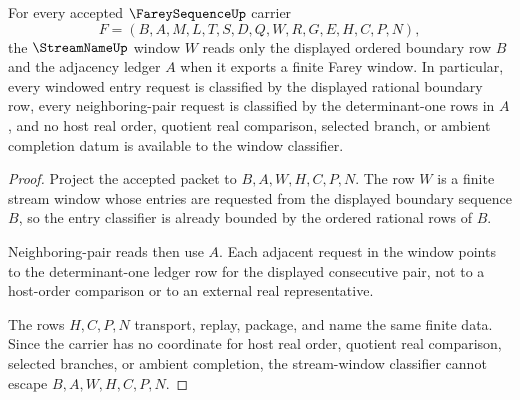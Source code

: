 \begin{theorem}
\label{thm:farey-sequence-stream-window-adjacency-scope}
For every accepted $\FareySequenceUp$ carrier
$$
F=(B,A,M,L,T,S,D,Q,W,R,G,E,H,C,P,N),
$$
the $\StreamNameUp$ window $W$ reads only the displayed ordered boundary row $B$ and the adjacency ledger $A$ when it exports a finite Farey window. In particular, every windowed entry request is classified by the displayed rational boundary row, every neighboring-pair request is classified by the determinant-one rows in $A$, and no host real order, quotient real comparison, selected branch, or ambient completion datum is available to the window classifier.
\end{theorem}
\begin{proof}
Project the accepted packet to $B,A,W,H,C,P,N$. The row $W$ is a finite stream window whose entries are requested from the displayed boundary sequence $B$, so the entry classifier is already bounded by the ordered rational rows of $B$.

Neighboring-pair reads then use $A$. Each adjacent request in the window points to the determinant-one ledger row for the displayed consecutive pair, not to a host-order comparison or to an external real representative.

The rows $H,C,P,N$ transport, replay, package, and name the same finite data. Since the carrier has no coordinate for host real order, quotient real comparison, selected branches, or ambient completion, the stream-window classifier cannot escape $B,A,W,H,C,P,N$.
\end{proof}

